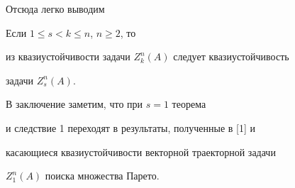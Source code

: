 Отсюда легко выводим





\begin{cor}


Если $1\leq s < k\leq n$, $n\geq 2$, то


из квазиустойчивости задачи $Z^n_k(A)$ следует квазиустойчивость


задачи $Z^n_s(A)$.


\end{cor}





В заключение заметим, что при $s=1$ теорема


и следствие 1 переходят в результаты, полученные в [1] и


касающиеся квазиустойчивости векторной траекторной задачи


$Z^n_1(A)$ поиска множества Парето.








